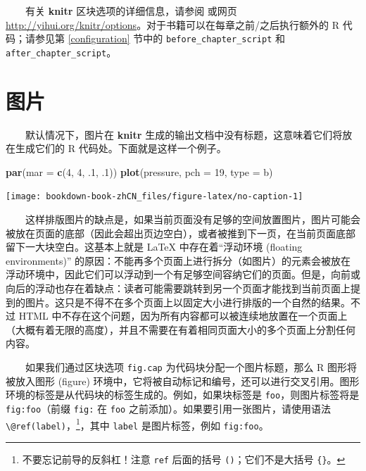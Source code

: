 \documentclass[
  12pt,
]{krantz}
\newenvironment{Shaded}{\begin{snugshade}}{\end{snugshade}}
\newcommand{\AttributeTok}[1]{\textcolor[rgb]{0.13,0.29,0.53}{#1}}
\newcommand{\DecValTok}[1]{\textcolor[rgb]{0.00,0.00,0.81}{#1}}
\newcommand{\FunctionTok}[1]{\textcolor[rgb]{0.13,0.29,0.53}{\textbf{#1}}}
\newcommand{\NormalTok}[1]{#1}
\newcommand{\StringTok}[1]{\textcolor[rgb]{0.31,0.60,0.02}{#1}}
\theoremstyle{definition}
\theoremstyle{definition}
\theoremstyle{definition}
\theoremstyle{definition}
\theoremstyle{remark}
\begin{document}
  有关 \textbf{knitr} 区块选项的详细信息，请参阅 \citet{xie2015} 或网页 \url{http://yihui.org/knitr/options}。对于书籍可以在每章之前/之后执行额外的 R 代码；请参见第 \ref{configuration} 节中的 \texttt{before\_chapter\_script} 和 \texttt{after\_chapter\_script}。

\hypertarget{figures}{%
\section{图片}\label{figures}}

  默认情况下，图片在 \textbf{knitr} 生成的输出文档中没有标题，这意味着它们将放在生成它们的 R 代码处。下面就是这样一个例子。

\begin{Shaded}
\begin{Highlighting}[]
\FunctionTok{par}\NormalTok{(}\AttributeTok{mar =} \FunctionTok{c}\NormalTok{(}\DecValTok{4}\NormalTok{, }\DecValTok{4}\NormalTok{, .}\DecValTok{1}\NormalTok{, .}\DecValTok{1}\NormalTok{))}
\FunctionTok{plot}\NormalTok{(pressure, }\AttributeTok{pch =} \DecValTok{19}\NormalTok{, }\AttributeTok{type =} \StringTok{\textquotesingle{}b\textquotesingle{}}\NormalTok{)}
\end{Highlighting}
\end{Shaded}

\texttt{[image: bookdown-book-zhCN\_files/figure-latex/no-caption-1]}

  这样排版图片的缺点是，如果当前页面没有足够的空间放置图片，图片可能会被放在页面的底部（因此会超出页边空白），或者被推到下一页，在当前页面底部留下一大块空白。这基本上就是 LaTeX 中存在着``浮动环境 (floating environments)'' 的原因：不能再多个页面上进行拆分（如图片）的元素会被放在浮动环境中，因此它们可以浮动到一个有足够空间容纳它们的页面。但是，向前或向后的浮动也存在着缺点：读者可能需要跳转到另一个页面才能找到当前页面上提到的图片。这只是不得不在多个页面上以固定大小进行排版的一个自然的结果。不过 HTML 中不存在这个问题，因为所有内容都可以被连续地放置在一个页面上（大概有着无限的高度），并且不需要在有着相同页面大小的多个页面上分割任何内容。

  如果我们通过区块选项 \texttt{fig.cap} 为代码块分配一个图片标题，那么 R 图形将被放入图形 (figure) 环境中，它将被自动标记和编号，还可以进行交叉引用。图形环境的标签是从代码块的标签生成的。例如，如果块标签是 \texttt{foo}，则图片标签将是 \texttt{fig:foo}（前缀 \texttt{fig:} 在 \texttt{foo} 之前添加）。如果要引用一张图片，请使用语法 \texttt{\textbackslash{}@ref(label)}，\footnote{不要忘记前导的反斜杠！注意 \texttt{ref} 后面的括号 \texttt{()}；它们不是大括号 \texttt{\{\}}。}，其中 \texttt{label} 是图片标签，例如 \texttt{fig:foo}。
\end{document}
